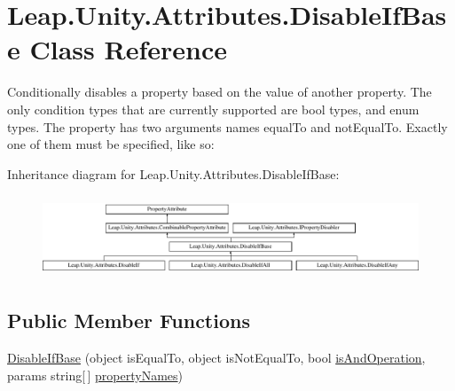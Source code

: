 \hypertarget{class_leap_1_1_unity_1_1_attributes_1_1_disable_if_base}{}\section{Leap.\+Unity.\+Attributes.\+Disable\+If\+Base Class Reference}
\label{class_leap_1_1_unity_1_1_attributes_1_1_disable_if_base}


Conditionally disables a property based on the value of another property. The only condition types that are currently supported are bool types, and enum types. The property has two arguments names \textquotesingle{}equal\+To\textquotesingle{} and \textquotesingle{}not\+Equal\+To\textquotesingle{}. Exactly one of them must be specified, like so\+:  


Inheritance diagram for Leap.\+Unity.\+Attributes.\+Disable\+If\+Base\+:\begin{figure}[H]
\begin{center}
\leavevmode
\includegraphics[height=2.464246cm]{class_leap_1_1_unity_1_1_attributes_1_1_disable_if_base}
\end{center}
\end{figure}
\subsection*{Public Member Functions}
\begin{DoxyCompactItemize}
\item 
\mbox{\hyperlink{class_leap_1_1_unity_1_1_attributes_1_1_disable_if_base_a4bbcfc61cfc971972a5ea0725916a44e}{Disable\+If\+Base}} (object is\+Equal\+To, object is\+Not\+Equal\+To, bool \mbox{\hyperlink{class_leap_1_1_unity_1_1_attributes_1_1_disable_if_base_a0b33d1b01859c98669e445ac4c0570fa}{is\+And\+Operation}}, params string\mbox{[}$\,$\mbox{]} \mbox{\hyperlink{class_leap_1_1_unity_1_1_attributes_1_1_disable_if_base_a5c529573cc3c68609da4337c7acf1cf2}{property\+Names}})
\end{DoxyCompactItemize}
